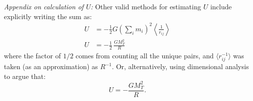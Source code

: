 \medskip
\noindent\emph{Appendix on calculation of $U$:} Other valid methods for
estimating $U$ include explicitly writing the sum as:
\begin{align*}
U &= -\frac{1}{2} G \left(\sum_i m_i\right)^{2}
     \left\langle \frac{1}{r_{ij}} \right\rangle \\
U &= -\frac{1}{2}\,\frac{G M_T^2}{R}
\end{align*}
where the factor of $1/2$ comes from counting all the unique pairs, and
$\langle r_{ij}^{-1} \rangle$ was taken (as an approximation) as $R^{-1}$.
Or, alternatively, using dimensional analysis to argue that:
\[
U = -\frac{G M_T^2}{R}.
\]
